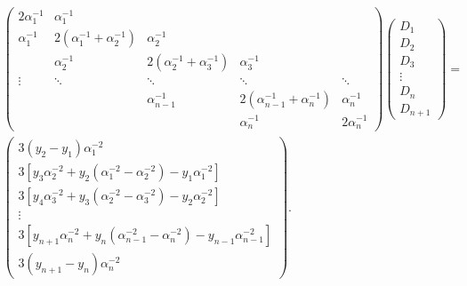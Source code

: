 \documentclass{scrartcl}
\begin{document}
\begin{align}
\left(\begin{array}{ccccc}
2\alpha_1^{-1}&\alpha_1^{-1}\\
  \alpha_1^{-1}&2(\alpha_1^{-1}+\alpha_2^{-1})&\alpha_2^{-1}\\
 &\alpha_2^{-1}&2(\alpha_2^{-1}+\alpha_3^{-1})&\alpha_3^{-1}\\
\vdots&\ddots&\ddots&\ddots&\ddots\\
&&\alpha_{n-1}^{-1}&2(\alpha_{n-1}^{-1}+\alpha_n^{-1})&\alpha_n^{-1}\\
&&&\alpha_n^{-1}&2\alpha_n^{-1}
\end{array}\right)
\left(\begin{array}{c}
D_1\\D_2\\D_3\\ \vdots\\D_n\\D_{n+1}
\end{array}\right) =\\
\left(\begin{array}{c}
3(y_2-y_1)\alpha_1^{-2}\\
3[y_3\alpha_2^{-2}
	+y_2(\alpha_1^{-2}
	-\alpha_2^{-2})
	-y_1\alpha_1^{-2}]\\
3[y_4\alpha_3^{-2}
	+y_3(\alpha_2^{-2}
	-\alpha_3^{-2})
	-y_2\alpha_2^{-2}]\\
\vdots\\
3[y_{n+1}\alpha_n^{-2}+y_n(\alpha_{n-1}^{-2}
	-\alpha_n^{-2})-y_{n-1}\alpha_{n-1}^{-2}]\\
3(y_{n+1}-y_n)\alpha_n^{-2}
\end{array}\right).\label{eq:eqtdi}
\end{align}
\end{document}
